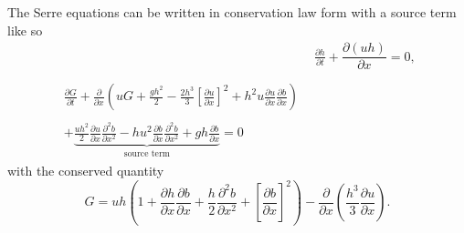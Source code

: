 \documentclass[times]{elsarticle}
\begin{document}
The Serre equations can be written in conservation law form with a source term \cite{Zoppou-etal-2017} like so
\begin{subequations}
	\label{eqn:FullSerreCon}
	\begin{align}
	& \frac{\partial h}{\partial t} + \dfrac{\partial (uh)}{\partial x} = 0 ,\label{eqn:FullSerreConMass}  \\ \nonumber \\
	\begin{split}
	\label{eqn:Serreconsconmom}
	\frac{\partial G}{\partial t}  + \frac{\partial}{\partial x} \left( {u} G + \frac{gh^2}{2} - \frac{2h^3}{3} \left[\frac{\partial {u}}{\partial x}\right]^2 + h^2 {u}\frac{\partial {u}}{\partial x}\frac{\partial b}{\partial x} \right) \\ \\ +  \underbrace{\frac{uh^2}{2} \frac{\partial {u}}{\partial x} \frac{\partial^2 b}{\partial x^2}  - h {u}^2\frac{\partial b}{\partial x}\frac{\partial^2 b}{\partial x^2} + gh\frac{\partial b}{\partial x} } _{\text{source term}} = 0
	\end{split}
	\end{align}
\end{subequations}
with the conserved quantity
\begin{equation}
\label{defn:SerreEqnConservedQuantity1}
G =  {u}h \left(1 + \frac{\partial h}{\partial x}\frac{\partial b}{\partial x} + \frac{h}{2}\frac{\partial^2 b}{\partial x^2} + \left[\frac{\partial b}{\partial x}\right]^2 \right) - \frac{\partial}{\partial x}\left(\frac{h^3}{3}  \frac{\partial {u}}{\partial x}\right).
\end{equation}
\end{document}
